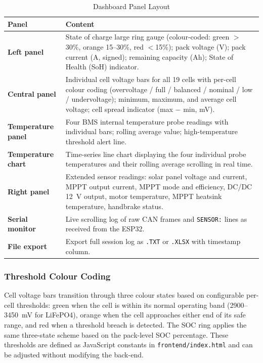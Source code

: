 \begin{table}[H]
\centering
\caption{Dashboard Panel Layout}
\label{tab:dashboard-panels}
\small
\begin{tabular}{>{\bfseries}p{3.2cm} p{10.0cm}}
\toprule
Panel & Content \\
\midrule
Left panel &
  State of charge large ring gauge (colour-coded: green $>$30\%, orange 15--30\%, red $<$15\%); pack voltage (V); pack current (A, signed); remaining capacity (Ah); State of Health (SoH) indicator. \\
\midrule
Central panel &
  Individual cell voltage bars for all 19 cells with per-cell colour coding (overvoltage / full / balanced / nominal / low / undervoltage); minimum, maximum, and average cell voltage; cell spread indicator (max $-$ min, mV). \\
\midrule
Temperature panel &
  Four BMS internal temperature probe readings with individual bars; rolling average value; high-temperature threshold alert line. \\
\midrule
Temperature chart &
  Time-series line chart displaying the four individual probe temperatures and their rolling average scrolling in real time. \\
\midrule
Right panel &
  Extended sensor readings: solar panel voltage and current, MPPT output current, MPPT mode and efficiency, DC/DC 12~V output, motor temperature, MPPT heatsink temperature, handbrake status. \\
\midrule
Serial monitor &
  Live scrolling log of raw CAN frames and \texttt{SENSOR:} lines as received from the ESP32. \\
\midrule
File export &
  Export full session log as \texttt{.TXT} or \texttt{.XLSX} with timestamp column. \\
\bottomrule
\end{tabular}
\end{table}

\subsubsection*{Threshold Colour Coding}

Cell voltage bars transition through three colour states based on configurable per-cell thresholds: green when the cell is within its normal operating band (2900--3450~mV for LiFePO4), orange when the cell approaches either end of its safe range, and red when a threshold breach is detected. The SOC ring applies the same three-state scheme based on the pack-level SOC percentage. These thresholds are defined as JavaScript constants in \texttt{frontend/index.html} and can be adjusted without modifying the back-end.

